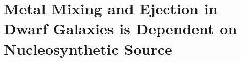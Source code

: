\chapter[Metal Mixing and Ejection in Dwarf Galaxies is Dependent on Nucleosynthetic Source]{Metal Mixing and Ejection in Dwarf Galaxies is Dependent on Nucleosynthetic Source \label{ch:chapter3}}
\let\thefootnote\relax{}

%
%



